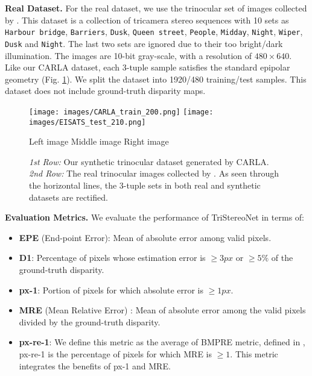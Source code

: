 \documentclass[10pt,twocolumn,letterpaper]{article}
\begin{document}
\noindent\textbf{Real Dataset.} For the real dataset, we use the trinocular set of images collected by \cite{HER11,SCH11}. This dataset is a collection of tricamera stereo sequences with 10 sets as {\tt{Harbour bridge}}, {\tt{Barriers}}, {\tt{Dusk}}, {\tt{Queen street}}, {\tt{People}}, {\tt{Midday}}, {\tt{Night}}, {\tt{Wiper}}, {\tt{Dusk}} and {\tt{Night}}. The last two sets are ignored due to their too bright/dark illumination. The images are 10-bit gray-scale, with a resolution of $480\times640$. Like our CARLA dataset, each 3-tuple sample satisfies the standard epipolar geometry (Fig. \ref{fig:datasets}). We split the dataset into 1920/480 training/test samples. This dataset does not include ground-truth disparity maps.
\begin{figure}[t]
	\begin{center}
		\texttt{[image: images/CARLA\_train\_200.png]}	
		\texttt{[image: images/EISATS\_test\_210.png]}	
		\begin{minipage}[c]{1\linewidth}
			\begin{center}
				\footnotesize{\hspace{0.2cm}Left image \hspace{1.2cm} Middle image \hspace{1.2cm} Right image}	
			\end{center}	
		\end{minipage}
	\end{center}
	\vspace{-0.6cm}
	\caption{\emph{1st Row:} Our synthetic trinocular dataset generated by CARLA. \emph{2nd Row:} The real trinocular images collected by \cite{HER11,SCH11}. As seen through the horizontal lines, the 3-tuple sets in both  real and synthetic datasets are rectified.}
	\label{fig:datasets}
\end{figure} 
\noindent\textbf{Evaluation Metrics.} We evaluate the performance of TriStereoNet in terms of:
\begin{itemize}[noitemsep,topsep=0pt,leftmargin=*]
	\item \textbf{EPE} (End-point Error): Mean of absolute error among valid pixels.
	\item \textbf{D1}: Percentage of pixels whose estimation error is $\geq3 px$ or $\geq5 \%$ of the ground-truth disparity.
	\item \textbf{px-1}: Portion of pixels for which absolute error is $\geq1 px$.
	\item \textbf{MRE} (Mean Relative Error) \cite{van2006real}: Mean of absolute error among the valid pixels divided by the ground-truth disparity.
	\item \textbf{px-re-1}: We define this metric as the average of BMPRE metric, defined in \cite{cabezas2012bmpre}, \ie px-re-1 is the percentage of pixels for which MRE is $\geq1$. This metric integrates the benefits of px-1 and MRE. 
\end{itemize}
\end{document}
